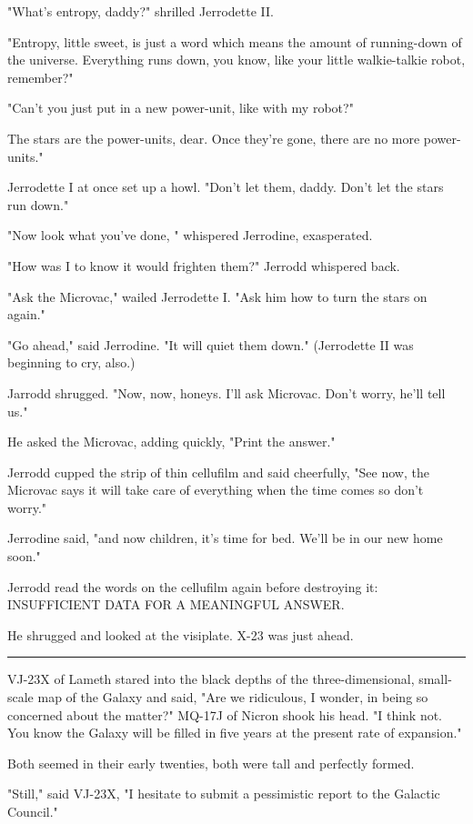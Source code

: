 \documentclass[11pt]{article}
\newcommand{\sep}[0]{\vspace{.5cm}\hrule\vspace{.5cm}}
\begin{document}
"What's entropy, daddy?" shrilled Jerrodette II.

"Entropy, little sweet, is just a word which means the amount of running-down of the universe. Everything runs down, you know, like your little walkie-talkie robot, remember?"

"Can't you just put in a new power-unit, like with my robot?"

The stars are the power-units, dear. Once they're gone, there are no more power-units."

Jerrodette I at once set up a howl. "Don't let them, daddy. Don't let the stars run down."

"Now look what you've done, " whispered Jerrodine, exasperated.

"How was I to know it would frighten them?" Jerrodd whispered back.

"Ask the Microvac," wailed Jerrodette I. "Ask him how to turn the stars on again."

"Go ahead," said Jerrodine. "It will quiet them down." (Jerrodette II was beginning to cry, also.)

Jarrodd shrugged. "Now, now, honeys. I'll ask Microvac. Don't worry, he'll tell us."

He asked the Microvac, adding quickly, "Print the answer."

Jerrodd cupped the strip of thin cellufilm and said cheerfully, "See now, the Microvac says it will take care of everything when the time comes so don't worry."

Jerrodine said, "and now children, it's time for bed. We'll be in our new home soon."

Jerrodd read the words on the cellufilm again before destroying it: INSUFFICIENT DATA FOR A MEANINGFUL ANSWER.

He shrugged and looked at the visiplate. X-23 was just ahead.

\sep{}

VJ-23X of Lameth stared into the black depths of the three-dimensional, small-scale map of the Galaxy and said, "Are we ridiculous, I wonder, in being so concerned about the matter?"
MQ-17J of Nicron shook his head. "I think not. You know the Galaxy will be filled in five years at the present rate of expansion."

Both seemed in their early twenties, both were tall and perfectly formed.

"Still," said VJ-23X, "I hesitate to submit a pessimistic report to the Galactic Council."
\end{document}
